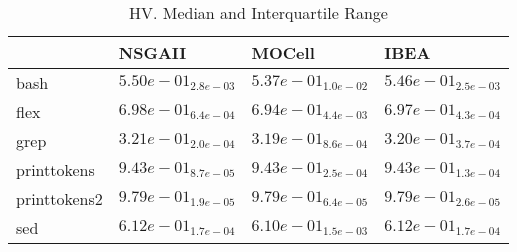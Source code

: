 \documentclass{article}
\begin{document}
\begin{table}
\caption{HV. Median and Interquartile Range}
\label{table: HV}
\centering
\begin{scriptsize}
\begin{tabular}{llll}
\hline & NSGAII & MOCell &  IBEA\\
\hline 
bash & \cellcolor{gray95}$  5.50e-01_{ 2.8e-03}$ & $  5.37e-01_{ 1.0e-02}$ & \cellcolor{gray25}$  5.46e-01_{ 2.5e-03}$ \\
flex & \cellcolor{gray95}$  6.98e-01_{ 6.4e-04}$ & $  6.94e-01_{ 4.4e-03}$ & \cellcolor{gray25}$  6.97e-01_{ 4.3e-04}$ \\
grep & \cellcolor{gray95}$  3.21e-01_{ 2.0e-04}$ & $  3.19e-01_{ 8.6e-04}$ & \cellcolor{gray25}$  3.20e-01_{ 3.7e-04}$ \\
printtokens & \cellcolor{gray95}$  9.43e-01_{ 8.7e-05}$ & $  9.43e-01_{ 2.5e-04}$ & \cellcolor{gray25}$  9.43e-01_{ 1.3e-04}$ \\
printtokens2 & \cellcolor{gray25}$  9.79e-01_{ 1.9e-05}$ & $  9.79e-01_{ 6.4e-05}$ & \cellcolor{gray95}$  9.79e-01_{ 2.6e-05}$ \\
sed & \cellcolor{gray95}$  6.12e-01_{ 1.7e-04}$ & $  6.10e-01_{ 1.5e-03}$ & \cellcolor{gray25}$  6.12e-01_{ 1.7e-04}$ \\
\hline
\end{tabular}
\end{scriptsize}
\end{table}
\end{document}
